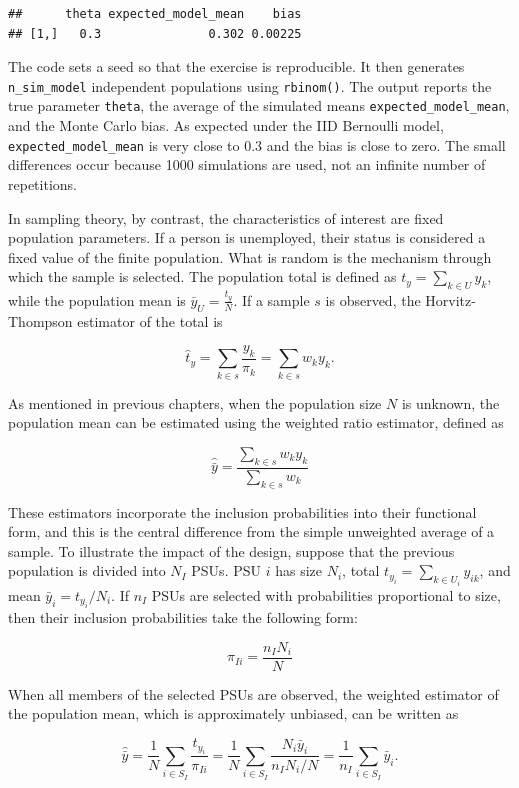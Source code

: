 \documentclass[
  english,
  12pt,
]{book}
\begin{document}
\begin{verbatim}
##      theta expected_model_mean    bias
## [1,]   0.3               0.302 0.00225
\end{verbatim}

The code sets a seed so that the exercise is reproducible. It then generates \texttt{n\_sim\_model} independent populations using \texttt{rbinom()}. The output reports the true parameter \texttt{theta}, the average of the simulated means \texttt{expected\_model\_mean}, and the Monte Carlo bias. As expected under the IID Bernoulli model, \texttt{expected\_model\_mean} is very close to 0.3 and the bias is close to zero. The small differences occur because 1000 simulations are used, not an infinite number of repetitions.

In sampling theory, by contrast, the characteristics of interest are fixed population parameters. If a person is unemployed, their status is considered a fixed value of the finite population. What is random is the mechanism through which the sample is selected. The population total is defined as \(t_y = \sum_{k \in U} y_k\), while the population mean is \(\bar{y}_U = \frac{t_y}{N}\). If a sample \(s\) is observed, the Horvitz-Thompson estimator of the total is

\[
\hat{t}_{y} = \sum_{k \in s}\frac{y_k}{\pi_k}
= \sum_{k \in s}w_k y_k.
\]

As mentioned in previous chapters, when the population size \(N\) is unknown, the population mean can be estimated using the weighted ratio estimator, defined as

\[
\hat{\bar{y}} =
\frac{\sum_{k \in s}w_k y_k}
{\sum_{k \in s}w_k}
\]

These estimators incorporate the inclusion probabilities into their functional form, and this is the central difference from the simple unweighted average of a sample. To illustrate the impact of the design, suppose that the previous population is divided into \(N_I\) PSUs. PSU \(i\) has size \(N_i\), total \(t_{y_i}=\sum_{k \in U_i}y_{ik}\), and mean \(\bar{y}_i=t_{y_i}/N_i\). If \(n_I\) PSUs are selected with probabilities proportional to size, then their inclusion probabilities take the following form:

\[
\pi_{Ii} = \frac{n_I N_i}{N}
\]

When all members of the selected PSUs are observed, the weighted estimator of the population mean, which is approximately unbiased, can be written as

\[
\hat{\bar{y}}
= \frac{1}{N}\sum_{i \in S_I}\frac{t_{y_i}}{\pi_{Ii}}
= \frac{1}{N}\sum_{i \in S_I}\frac{N_i\bar{y}_i}{n_I N_i/N}
= \frac{1}{n_I}\sum_{i \in S_I}\bar{y}_i.
\]
\end{document}
